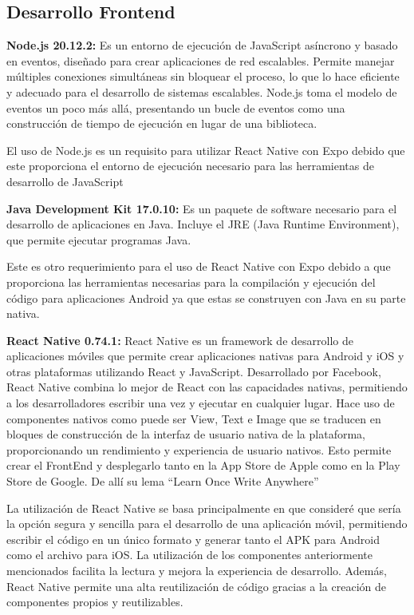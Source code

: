 \subsection{Desarrollo Frontend}

\textbf{Node.js 20.12.2:} Es un entorno de ejecución de JavaScript asíncrono y basado en eventos, diseñado para crear aplicaciones de red escalables. Permite manejar múltiples conexiones simultáneas sin bloquear el proceso, lo que lo hace eficiente y adecuado para el desarrollo de sistemas escalables. Node.js toma el modelo de eventos un poco más allá, presentando un bucle de eventos como una construcción de tiempo de ejecución en lugar de una biblioteca. \cite{nodejs}

El uso de Node.js es un requisito para utilizar React Native con Expo debido que este proporciona el entorno de ejecución necesario para las herramientas de desarrollo de JavaScript

\textbf{Java Development Kit 17.0.10:} Es un paquete de software necesario para el desarrollo de aplicaciones en Java. Incluye el JRE (Java Runtime Environment), que permite ejecutar programas Java. \cite{geeksforgeeks}

Este es otro requerimiento para el uso de React Native con Expo debido a que proporciona las herramientas necesarias para la compilación y ejecución del código para aplicaciones Android ya que estas se construyen con Java en su parte nativa.

\textbf{React Native 0.74.1:} React Native es un framework de desarrollo de aplicaciones móviles que permite crear aplicaciones nativas para Android y iOS y otras plataformas utilizando React y JavaScript. Desarrollado por Facebook, React Native combina lo mejor de React con las capacidades nativas, permitiendo a los desarrolladores escribir una vez y ejecutar en cualquier lugar. Hace uso de componentes nativos como puede ser View, Text e Image que se traducen en bloques de construcción de la interfaz de usuario nativa de la plataforma, proporcionando un rendimiento y experiencia de usuario nativos. Esto permite crear el FrontEnd y desplegarlo tanto en la App Store de Apple como en la Play Store de Google. De allí su lema “Learn Once Write Anywhere” \cite{react_native}

La utilización de React Native se basa principalmente en que consideré que sería la opción segura y sencilla para el desarrollo de una aplicación móvil, permitiendo escribir el código en un único formato y generar tanto el APK para Android como el archivo para iOS. La utilización de los componentes anteriormente mencionados facilita la lectura y mejora la experiencia de desarrollo. Además, React Native permite una alta reutilización de código gracias a la creación de componentes propios y reutilizables. 


